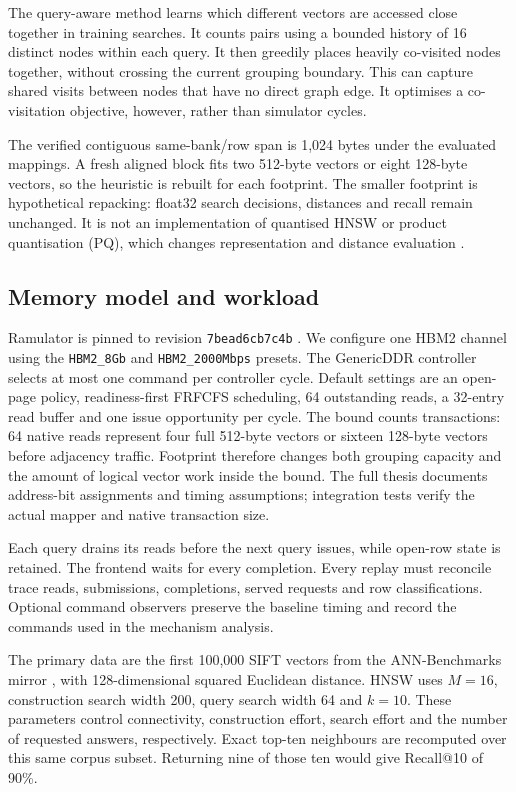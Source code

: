 \documentclass[conference]{IEEEtran}
\begin{document}
The query-aware method learns which different vectors are accessed close together in training searches. It counts pairs using a bounded history of 16 distinct nodes within each query. It then greedily places heavily co-visited nodes together, without crossing the current grouping boundary. This can capture shared visits between nodes that have no direct graph edge. It optimises a co-visitation objective, however, rather than simulator cycles.

The verified contiguous same-bank/row span is 1,024 bytes under the evaluated mappings. A fresh aligned block fits two 512-byte vectors or eight 128-byte vectors, so the heuristic is rebuilt for each footprint. The smaller footprint is hypothetical repacking: float32 search decisions, distances and recall remain unchanged. It is not an implementation of quantised HNSW or product quantisation (PQ), which changes representation and distance evaluation \cite{pq}.

\subsection{Memory model and workload}
Ramulator is pinned to revision \texttt{7bead6cb7c4b} \cite{ramulator,ramsource}. We configure one HBM2 channel using the \texttt{HBM2\_8Gb} and \texttt{HBM2\_2000Mbps} presets. The GenericDDR controller selects at most one command per controller cycle. Default settings are an open-page policy, readiness-first FRFCFS scheduling, 64 outstanding reads, a 32-entry read buffer and one issue opportunity per cycle. The bound counts transactions: 64 native reads represent four full 512-byte vectors or sixteen 128-byte vectors before adjacency traffic. Footprint therefore changes both grouping capacity and the amount of logical vector work inside the bound. The full thesis documents address-bit assignments and timing assumptions; integration tests verify the actual mapper and native transaction size.

Each query drains its reads before the next query issues, while open-row state is retained. The frontend waits for every completion. Every replay must reconcile trace reads, submissions, completions, served requests and row classifications. Optional command observers preserve the baseline timing and record the commands used in the mechanism analysis.

The primary data are the first 100,000 SIFT vectors from the ANN-Benchmarks mirror \cite{annbench}, with 128-dimensional squared Euclidean distance. HNSW uses $M=16$, construction search width 200, query search width 64 and $k=10$. These parameters control connectivity, construction effort, search effort and the number of requested answers, respectively. Exact top-ten neighbours are recomputed over this same corpus subset. Returning nine of those ten would give Recall@10 of 90\%.
\end{document}
